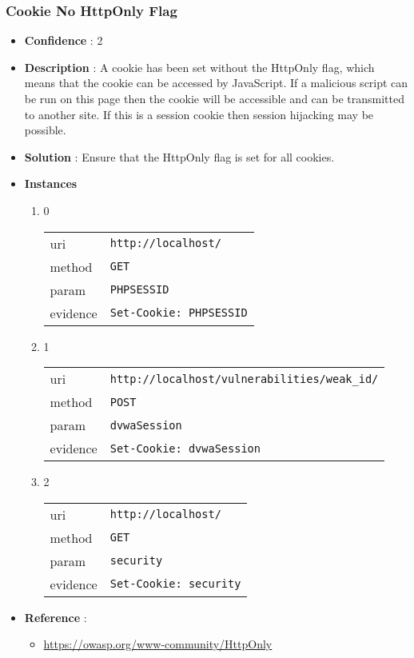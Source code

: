 \documentclass[10pt]{article}
\begin{document}
\subsubsection{Cookie No HttpOnly Flag}
\begin{itemize}
\item[] \textbf{Confidence} : 2
\item[] \textbf{Description} : A cookie has been set without the HttpOnly flag, which means that the cookie can be accessed by JavaScript. If a malicious script can be run on this page then the cookie will be accessible and can be transmitted to another site. If this is a session cookie then session hijacking may be possible.
\item[] \textbf{Solution} :  Ensure that the HttpOnly flag is set for all cookies.
\item[] \textbf{Instances}
\begin{enumerate}
\item[] 0
\begin{tabular}{| l | p{12cm}}
uri & \texttt{http://localhost/} \\
method & \texttt{GET} \\
param & \texttt{PHPSESSID} \\
evidence & \texttt{Set-Cookie: PHPSESSID} \\
\end{tabular}
\item[] 1
\begin{tabular}{| l | p{12cm}}
uri & \texttt{http://localhost/vulnerabilities/weak\_id/} \\
method & \texttt{POST} \\
param & \texttt{dvwaSession} \\
evidence & \texttt{Set-Cookie: dvwaSession} \\
\end{tabular}
\item[] 2
\begin{tabular}{| l | p{12cm}}
uri & \texttt{http://localhost/} \\
method & \texttt{GET} \\
param & \texttt{security} \\
evidence & \texttt{Set-Cookie: security} \\
\end{tabular}
\end{enumerate}
\item[] \textbf{Reference} : 
\begin{itemize}
\item \url{https://owasp.org/www-community/HttpOnly}
\end{itemize}
\end{itemize}
\end{document}
